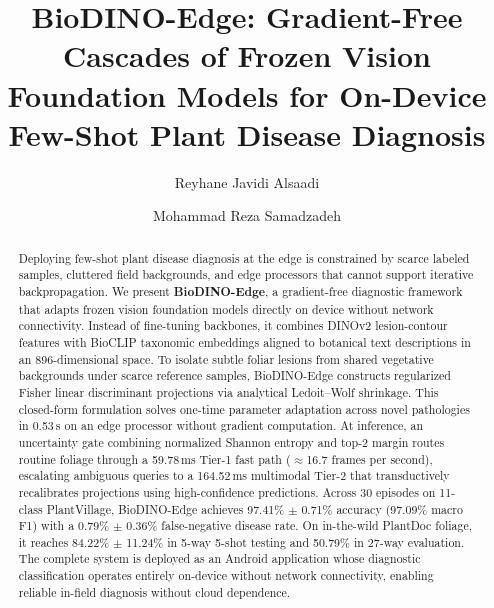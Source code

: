 \documentclass[preprint,12pt]{elsarticle}
\begin{document}
\begin{frontmatter}

\title{BioDINO-Edge: Gradient-Free Cascades of Frozen Vision Foundation Models for On-Device Few-Shot Plant Disease Diagnosis}

\author[1]{Reyhane Javidi Alsaadi}

\author[1]{Mohammad Reza Samadzadeh}



\begin{abstract}
Deploying few-shot plant disease diagnosis at the edge is constrained by scarce labeled samples, cluttered field backgrounds, and edge processors that cannot support iterative backpropagation. We present \textbf{BioDINO-Edge}, a gradient-free diagnostic framework that adapts frozen vision foundation models directly on device without network connectivity. Instead of fine-tuning backbones, it combines DINOv2 lesion-contour features with BioCLIP taxonomic embeddings aligned to botanical text descriptions in an 896-dimensional space. To isolate subtle foliar lesions from shared vegetative backgrounds under scarce reference samples, BioDINO-Edge constructs regularized Fisher linear discriminant projections via analytical Ledoit--Wolf shrinkage. This closed-form formulation solves one-time parameter adaptation across novel pathologies in 0.53\,s on an edge processor without gradient computation. At inference, an uncertainty gate combining normalized Shannon entropy and top-2 margin routes routine foliage through a 59.78\,ms Tier-1 fast path ($\approx$16.7 frames per second), escalating ambiguous queries to a 164.52\,ms multimodal Tier-2 that transductively recalibrates projections using high-confidence predictions. Across 30 episodes on 11-class PlantVillage, BioDINO-Edge achieves 97.41\% $\pm$ 0.71\% accuracy (97.09\% macro F1) with a 0.79\% $\pm$ 0.36\% false-negative disease rate. On in-the-wild PlantDoc foliage, it reaches 84.22\% $\pm$ 11.24\% in 5-way 5-shot testing and 50.79\% in 27-way evaluation. The complete system is deployed as an Android application whose diagnostic classification operates entirely on-device without network connectivity, enabling reliable in-field diagnosis without cloud dependence.
\end{abstract}


\end{frontmatter}
\end{document}
